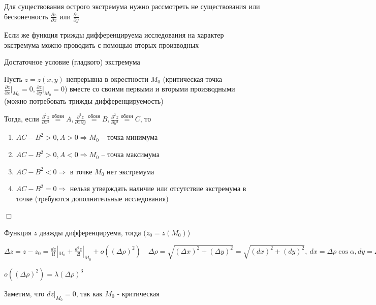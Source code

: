 \documentclass[12pt]{article}
\begin{document}
    Для существования острого экстремума нужно рассмотреть не существования или бесконечность $\frac{\partial z}{\partial x}$ или $\frac{\partial z}{\partial y}$

    Если же функция трижды дифференцируема исследования на характер экстремума можно проводить с помощью вторых производных

    \hypertarget{extremumsufficientcondition}{}

    \begin{MyTheorem}
        \Ths Достаточное условие (гладкого) экстремума

        Пусть $z = z(x, y)$ непрерывна в окрестности $M_0$ (критическая точка $\frac{\partial z}{\partial x} \Big|_{M_0} = 0, \frac{\partial z}{\partial y} \Big|_{M_0} = 0$)
        вместе со своими первыми и вторыми производными (можно потребовать трижды дифференцируемость)

        Тогда, если $\frac{\partial^2 z}{\partial x^2} \stackrel{\text{обозн}}{=} A, \frac{\partial^2 z}{\partial x \partial y} \stackrel{\text{обозн}}{=} B, \frac{\partial^2 z}{\partial y^2} \stackrel{\text{обозн}}{=} C$, то

        \begin{enumerate}
            \item $AC - B^2 > 0, A > 0 \Longrightarrow M_0$ -- точка минимума
            \item $AC - B^2 > 0, A < 0 \Longrightarrow M_0$ -- точка максимума
            \item $AC - B^2 < 0 \Longrightarrow$ в точке $M_0$ нет экстремума
            \item $AC - B^2 = 0\Longrightarrow$ нельзя утверждать наличие или отсутствие экстремума в точке (требуются дополнительные исследования)
        \end{enumerate}
    \end{MyTheorem}

    $\Box$

    Функция $z$ дважды дифференцируема, тогда ($z_0 = z(M_0)$)

    $\Delta z = z - z_0 = \frac{dz}{1!} |_{M_0} + \frac{d^2 z}{2!} |_{M_0} + o((\Delta \rho)^2) \quad \Delta \rho = \sqrt{(\Delta x)^2 + (\Delta y)^2} = \sqrt{(dx)^2 + (dy)^2}, \ dx = \Delta\rho \cos\alpha, dy = \Delta\rho \sin\alpha$

    $o((\Delta \rho)^2) = \lambda (\Delta \rho)^3$

    Заметим, что $dz |_{M_0} = 0$, так как $M_0$ - критическая
\end{document}
